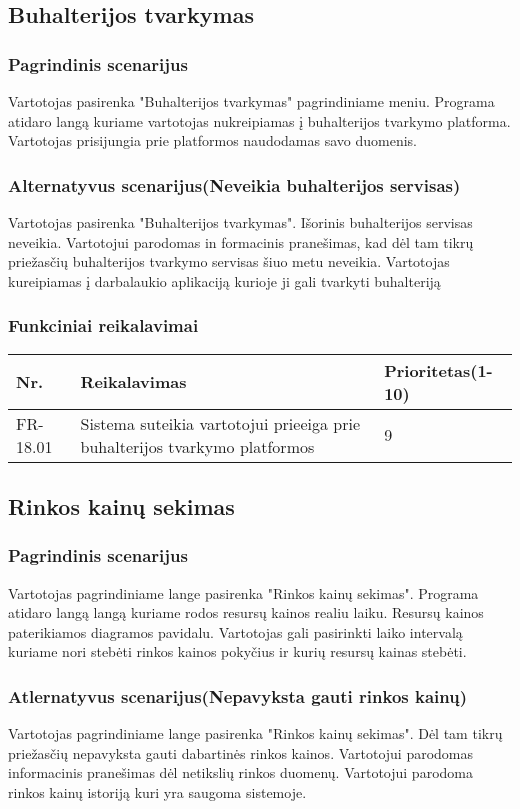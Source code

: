 \documentclass[oneside]{VUMIFPSkursinis}
\begin{document}
\subsection{Buhalterijos tvarkymas}
	\subsubsection{Pagrindinis scenarijus}
	Vartotojas pasirenka "Buhalterijos tvarkymas" pagrindiniame meniu. Programa atidaro langą kuriame vartotojas nukreipiamas į buhalterijos tvarkymo platforma. Vartotojas prisijungia prie platformos naudodamas savo duomenis.
	\subsubsection{Alternatyvus scenarijus(Neveikia buhalterijos servisas)}
	Vartotojas pasirenka "Buhalterijos tvarkymas". Išorinis buhalterijos servisas neveikia. Vartotojui parodomas in formacinis pranešimas, kad dėl tam tikrų priežasčių buhalterijos tvarkymo servisas šiuo metu neveikia. Vartotojas kureipiamas į darbalaukio aplikaciją kurioje ji gali tvarkyti buhalteriją
	\subsubsection{Funkciniai reikalavimai}
	\begin{table}[htbp]
	\begin{tabularx}{1\textwidth}{ |P{2.5cm}|X|P{3cm }| }  \hline
		Nr. & Reikalavimas & Prioritetas(1-10) \\ \hline
		FR-18.01 & Sistema suteikia vartotojui prieeiga prie buhalterijos tvarkymo platformos & 9 \\ \hline
	\end{tabularx}
\end{table}
\subsection{Rinkos kainų sekimas}
	\subsubsection{Pagrindinis scenarijus}
	Vartotojas pagrindiniame lange pasirenka "Rinkos kainų sekimas". Programa atidaro langą langą kuriame rodos resursų kainos realiu laiku. Resursų kainos paterikiamos diagramos pavidalu. Vartotojas gali pasirinkti laiko intervalą kuriame nori stebėti rinkos kainos pokyčius ir kurių resursų kainas stebėti.
	\subsubsection{Atlernatyvus scenarijus(Nepavyksta gauti rinkos kainų)}
	Vartotojas pagrindiniame lange pasirenka "Rinkos kainų sekimas". Dėl tam tikrų priežasčių nepavyksta gauti dabartinės rinkos kainos. Vartotojui parodomas informacinis pranešimas dėl netikslių rinkos duomenų. Vartotojui parodoma rinkos kainų istoriją kuri yra saugoma sistemoje.
\end{document}
